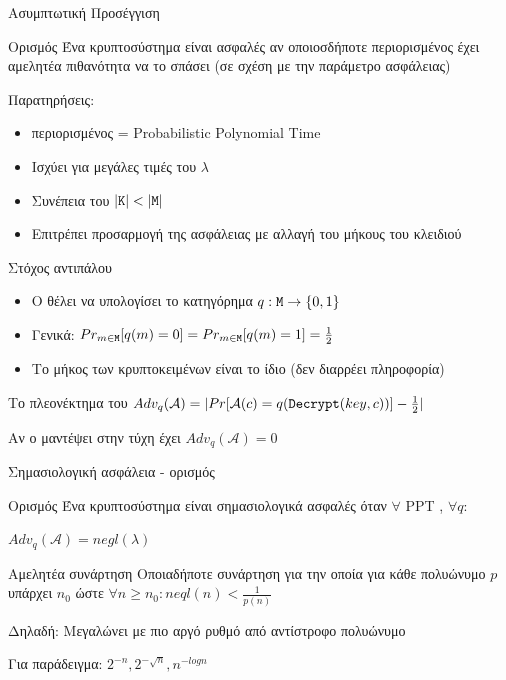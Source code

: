 \documentclass[handout]{beamer}
\begin{document}
\begin{frame}{Ασυμπτωτική Προσέγγιση}
\begin{block}{Ορισμός}
Ένα κρυπτοσύστημα είναι ασφαλές αν οποιοσδήποτε περιορισμένος \adv έχει αμελητέα πιθανότητα να το σπάσει (σε σχέση με την παράμετρο ασφάλειας)
\end{block}
\pause
Παρατηρήσεις:
\begin{itemize}
	\item περιορισμένος = Probabilistic Polynomial Time
	\item Ισχύει για μεγάλες τιμές του $\lambda$
	\item Συνέπεια του $|\mathtt{K}| < |\mathtt{M}|$
	\item Επιτρέπει προσαρμογή της ασφάλειας με αλλαγή του μήκους του κλειδιού
\end{itemize}
\end{frame}

\begin{frame}{Στόχος αντιπάλου}

\begin{itemize}
\item O \adv θέλει να υπολογίσει το κατηγόρημα $q: \mathtt{M} \rightarrow \{0,1\}$ \pause
\item Γενικά: $Pr_{m \in \mathtt{M}}[q(m)=0]=Pr_{m \in \mathtt{M}}[q(m)=1]=\frac{1}{2}$
\item Το μήκος των κρυπτοκειμένων είναι το ίδιο (δεν διαρρέει πληροφορία)
\end{itemize}

\pause

\begin{block}{Το πλεονέκτημα του \adv}
$Adv_q(\mathcal{A}) = |Pr[\mathcal{A}(c)=q(\mathtt{Decrypt}(key,c))]-\frac{1}{2}|$
\end{block}
\pause

Αν ο \adv μαντέψει στην τύχη έχει $Adv_q(\mathcal{A})=0$

\end{frame}


\begin{frame}{Σημασιολογική ασφάλεια - ορισμός}
\begin{block}{Ορισμός}
Ένα κρυπτοσύστημα είναι σημασιολογικά ασφαλές όταν $\forall$ PPT \adv, $\forall q$:
\begin{center}
$Adv_q(\mathcal{A})=negl(\lambda)$
\end{center}
\end{block}

\pause

\begin{block}{Αμελητέα συνάρτηση}
Οποιαδήποτε συνάρτηση για την οποία για κάθε πολυώνυμο $p$ υπάρχει $n_0$ ώστε $\forall n \geq n_0: neql(n)<\frac{1}{p(n)}$
\end{block}

Δηλαδή: Μεγαλώνει με πιο αργό ρυθμό από αντίστροφο πολυώνυμο

Για παράδειγμα: $2^{-n},2^{-\sqrt{n}},n^{-log{n}} $
 
\end{frame}
\end{document}
